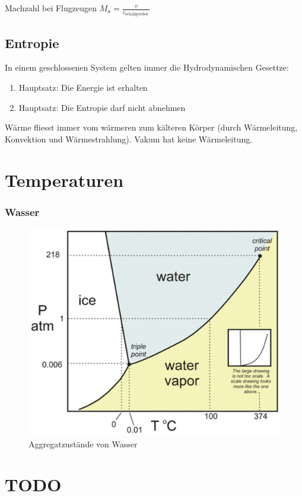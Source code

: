 \documentclass[a4paper]{scrartcl}
\begin{document}
Machzahl bei Flugzeugen $M_a = \frac{v}{c_{\text{schallgeschw.}}}$




\subsection{Entropie}

In einem geschlossenen System gelten immer die Hydrodynamischen Gesettze:

\begin{enumerate}
	\item Hauptsatz: Die Energie ist erhalten
	\item Hauptsatz: Die Entropie darf nicht abnehmen
\end{enumerate}

Wärme fliesst immer vom wärmeren zum kälteren Körper (durch Wärmeleitung, Konvektion und Wärmestrahlung). Vakum hat keine Wärmeleitung.


\section{Temperaturen}

\subsubsection{Wasser}

\begin{figure}[h]
	\centering
	\includegraphics[width=0.7\linewidth]{img/wasser_aggregatszustaende}
	\caption{Aggregatzustände von Wasser}
	\label{fig:wasseraggregatszustaende}
\end{figure}


\section{TODO}
\end{document}
